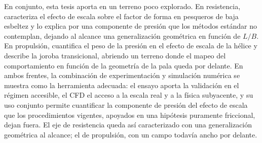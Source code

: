 En conjunto, esta tesis aporta en un terreno poco explorado. En resistencia,
caracteriza el efecto de escala sobre el factor de forma en pesqueros de baja esbeltez y
lo explica por una componente de presión que los métodos estándar no contemplan,
dejando al alcance una generalización geométrica en función de $L/B$. En propulsión,
cuantifica el peso de la presión en el efecto de escala de la hélice y describe la
joroba transicional, abriendo un terreno donde el mapeo del
comportamiento en función de la geometría de la pala queda por delante. En ambos
frentes, la combinación de experimentación y simulación numérica se muestra como la
herramienta adecuada: el ensayo aporta la validación en el régimen accesible, el CFD
el acceso a la escala real y a la física subyacente, y su uso conjunto permite
cuantificar la componente de presión del efecto de escala que los procedimientos
vigentes, apoyados en una hipótesis puramente friccional, dejan fuera. El eje de
resistencia queda así caracterizado con una generalización geométrica al alcance;
el de propulsión, con un campo todavía ancho por delante.